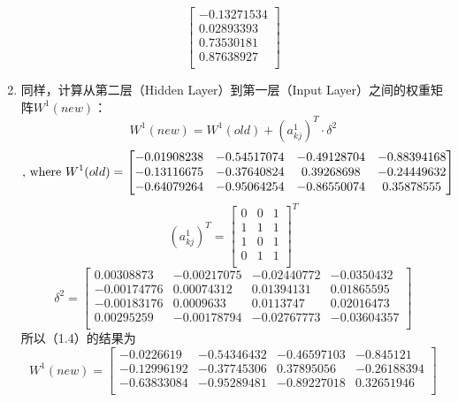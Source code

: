 \documentclass[a4paper,12pt,oneside]{book}
\begin{document}
\begin{enumerate}
\begin{equation*}
\begin{bmatrix}
            -0.13271534\\
            0.02893393\\
            0.73530181\\
            0.87638927\\
        \end{bmatrix}
    \end{equation*}
    \item 同样，计算从第二层（Hidden Layer）到第一层（Input Layer）之间的权重矩阵$W^1(new)$：
    \begin{equation}
        W^1(new) = W^1(old) + (a^1_{kj})^T \cdot \delta^2
    \end{equation}
    \begin{equation*}
        \text{, where  } \\
        W^1(old) = \begin{bmatrix}
            -0.01908238 & -0.54517074 & -0.49128704 & -0.88394168\\
            -0.13116675 & -0.37640824 & 0.39268698 & -0.24449632\\
            -0.64079264 & -0.95064254 & -0.86550074 & 0.35878555\\
        \end{bmatrix}
    \end{equation*}
    \begin{equation*}
        (a^1_{kj})^T = 
        \begin{bmatrix}
            0 & 0 & 1\\
            1 & 1 & 1\\
            1 & 0 & 1\\
            0 & 1 & 1\\
        \end{bmatrix}^T
    \end{equation*}
    \begin{equation*}
        \delta^2 = 
        \begin{bmatrix}
            0.00308873 & -0.00217075 & -0.02440772 & -0.0350432\\
            -0.00174776 & 0.00074312 & 0.01394131 & 0.01865595\\
            -0.00183176 & 0.0009633 & 0.0113747 & 0.02016473\\
            0.00295259 & -0.00178794 & -0.02767773 & -0.03604357\\
        \end{bmatrix}
    \end{equation*}
    所以（1.4）的结果为
    \begin{equation*}
        W^1(new)=\begin{bmatrix}
            -0.0226619 & -0.54346432 & -0.46597103 & -0.845121\\
            -0.12996192 & -0.37745306 & 0.37895056 & -0.26188394\\
            -0.63833084 & -0.95289481 & -0.89227018 & 0.32651946\\
        \end{bmatrix}
    \end{equation*}
\end{enumerate}
\end{document}
